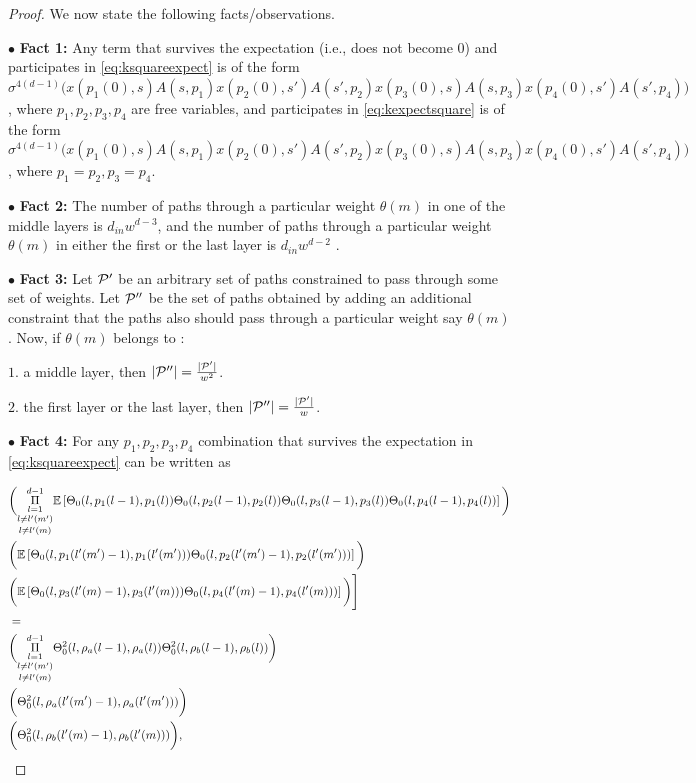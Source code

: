 \begin{proof}
We now state the following facts/observations.

$\bullet$ \textbf{Fact 1:} Any term that survives the expectation (i.e., does not become $0$) and participates in \eqref{eq:ksquareexpect} is of the form $\sigma^{4(d-1)}\big(x(p_1(0),s)A(s,p_1)x(p_2(0),s')A(s',p_2)x(p_3(0),s)A(s,p_3)x(p_4(0),s')A(s',p_4)\big)$, where $p_1,p_2,p_3,p_4$ are free variables, and participates in \eqref{eq:kexpectsquare} is of the form $\sigma^{4(d-1)}\big(x(p_1(0),s)A(s,p_1)x(p_2(0),s')A(s',p_2)x(p_3(0),s)A(s,p_3)x(p_4(0),s')A(s',p_4)\big)$, where $p_1=p_2,p_3=p_4$.

$\bullet$ \textbf{Fact 2:} The number of paths through a particular weight $\theta(m)$ in one of the middle layers is $d_{in}w^{d-3}$, and the number of paths through a particular weight $\theta(m)$ in either the first or the last layer is $d_{in}w^{d-2}$ .

$\bullet$ \textbf{Fact 3:} Let $\P'$ be an arbitrary set of paths constrained to pass through some set of weights. Let $\P''$ be the set of paths obtained by adding an additional constraint that the paths also should pass through a particular weight say $\theta(m)$. Now, if $\theta(m)$ belongs to :

$1.$ a middle layer, then $|\P''|=\frac{|\P'|}{w^2}$.

$2.$ the first layer or the last layer, then $|\P''|=\frac{|\P'|}{w}$.

$\bullet$ \textbf{Fact 4:} For any $p_1,p_2,p_3,p_4$ combination that survives the expectation in \eqref{eq:ksquareexpect} can be written as 

\begin{align*}
&\bigg( \underset{l\neq l'(m)} {\underset{l\neq l'(m')}{\underset{l=1}{\overset{d-1}{\Pi}}}} \E{\Tb_0(l,p_1(l-1),p_1(l)) \Tb_0(l,p_2(l-1),p_2(l))\Tb_0(l,p_3(l-1),p_3(l)) \Tb_0(l,p_4(l-1),p_4(l))} \bigg)\nn\\
&\bigg( \E{\Tb_0(l,p_1(l'(m')-1),p_1(l'(m'))) \Tb_0(l,p_2(l'(m')-1),p_2(l'(m')))}\bigg)\nn\\
&\bigg(\E{\Tb_0(l,p_3(l'(m)-1),p_3(l'(m))) \Tb_0(l,p_4(l'(m)-1),p_4(l'(m)))} \bigg)\Bigg]\nn\\
&=\\
&\bigg( \underset{l\neq l'(m)} {\underset{l\neq l'(m')}{\underset{l=1}{\overset{d-1}{\Pi}}}} \Tb^2_0(l,\rho_a(l-1),\rho_a(l)) \Tb^2_0(l,\rho_b(l-1),\rho_b(l)) \bigg)\nn\\
&\bigg( \Tb^2_0(l,\rho_a(l'(m')-1),\rho_a(l'(m')))\bigg)\nn\\
&\bigg({\Tb^2_0(l,\rho_b(l'(m)-1),\rho_b(l'(m)))} \bigg),
\end{align*}


\end{proof}
